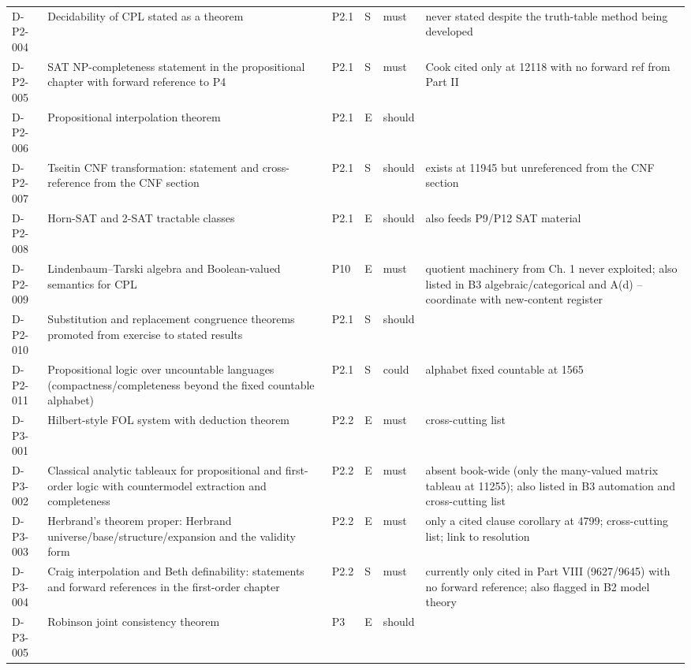 \begin{longtable}{@{}p{0.62in}p{2.6in}p{0.75in}p{0.22in}p{0.42in}p{1.85in}@{}}
D-P2-004 & Decidability of CPL stated as a theorem & P2.1 & S & must & never stated despite the truth-table method being developed \\
D-P2-005 & SAT NP-completeness statement in the propositional chapter with forward reference to P4 & P2.1 & S & must & Cook cited only at 12118 with no forward ref from Part II \\
D-P2-006 & Propositional interpolation theorem & P2.1 & E & should &  \\
D-P2-007 & Tseitin CNF transformation: statement and cross-reference from the CNF section & P2.1 & S & should & exists at 11945 but unreferenced from the CNF section \\
D-P2-008 & Horn-SAT and 2-SAT tractable classes & P2.1 & E & should & also feeds P9/P12 SAT material \\
D-P2-009 & Lindenbaum--Tarski algebra and Boolean-valued semantics for CPL & P10 & E & must & quotient machinery from Ch. 1 never exploited; also listed in B3 algebraic/categorical and A(d) -- coordinate with new-content register \\
D-P2-010 & Substitution and replacement congruence theorems promoted from exercise to stated results & P2.1 & S & should &  \\
D-P2-011 & Propositional logic over uncountable languages (compactness/completeness beyond the fixed countable alphabet) & P2.1 & S & could & alphabet fixed countable at 1565 \\
D-P3-001 & Hilbert-style FOL system with deduction theorem & P2.2 & E & must & cross-cutting list \\
D-P3-002 & Classical analytic tableaux for propositional and first-order logic with countermodel extraction and completeness & P2.2 & E & must & absent book-wide (only the many-valued matrix tableau at 11255); also listed in B3 automation and cross-cutting list \\
D-P3-003 & Herbrand's theorem proper: Herbrand universe/base/structure/expansion and the validity form & P2.2 & E & must & only a cited clause corollary at 4799; cross-cutting list; link to resolution \\
D-P3-004 & Craig interpolation and Beth definability: statements and forward references in the first-order chapter & P2.2 & S & must & currently only cited in Part VIII (9627/9645) with no forward reference; also flagged in B2 model theory \\
D-P3-005 & Robinson joint consistency theorem & P3 & E & should &  \\

\end{longtable}
